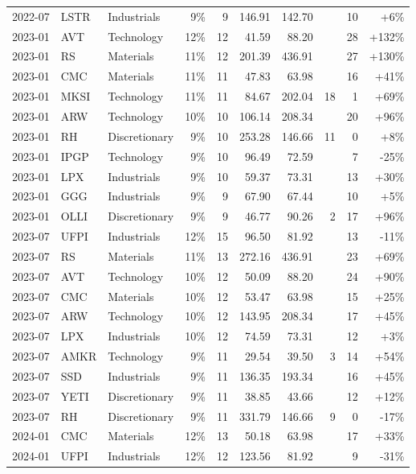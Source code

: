 \documentclass[11pt,a4paper]{article}
\begin{document}
{\begin{longtable}{l l l r r r r r r r}
2022-07 & LSTR & Industrials & 9\% & 9 & 146.91 & 142.70 &  & 10 & +6\% \\
2023-01 & AVT & Technology & 12\% & 12 & 41.59 & 88.20 &  & 28 & +132\% \\
2023-01 & RS & Materials & 11\% & 12 & 201.39 & 436.91 &  & 27 & +130\% \\
2023-01 & CMC & Materials & 11\% & 11 & 47.83 & 63.98 &  & 16 & +41\% \\
2023-01 & MKSI & Technology & 11\% & 11 & 84.67 & 202.04 & 18 & 1 & +69\% \\
2023-01 & ARW & Technology & 10\% & 10 & 106.14 & 208.34 &  & 20 & +96\% \\
2023-01 & RH & Discretionary & 9\% & 10 & 253.28 & 146.66 & 11 & 0 & +8\% \\
2023-01 & IPGP & Technology & 9\% & 10 & 96.49 & 72.59 &  & 7 & -25\% \\
2023-01 & LPX & Industrials & 9\% & 10 & 59.37 & 73.31 &  & 13 & +30\% \\
2023-01 & GGG & Industrials & 9\% & 9 & 67.90 & 67.44 &  & 10 & +5\% \\
2023-01 & OLLI & Discretionary & 9\% & 9 & 46.77 & 90.26 & 2 & 17 & +96\% \\
2023-07 & UFPI & Industrials & 12\% & 15 & 96.50 & 81.92 &  & 13 & -11\% \\
2023-07 & RS & Materials & 11\% & 13 & 272.16 & 436.91 &  & 23 & +69\% \\
2023-07 & AVT & Technology & 10\% & 12 & 50.09 & 88.20 &  & 24 & +90\% \\
2023-07 & CMC & Materials & 10\% & 12 & 53.47 & 63.98 &  & 15 & +25\% \\
2023-07 & ARW & Technology & 10\% & 12 & 143.95 & 208.34 &  & 17 & +45\% \\
2023-07 & LPX & Industrials & 10\% & 12 & 74.59 & 73.31 &  & 12 & +3\% \\
2023-07 & AMKR & Technology & 9\% & 11 & 29.54 & 39.50 & 3 & 14 & +54\% \\
2023-07 & SSD & Industrials & 9\% & 11 & 136.35 & 193.34 &  & 16 & +45\% \\
2023-07 & YETI & Discretionary & 9\% & 11 & 38.85 & 43.66 &  & 12 & +12\% \\
2023-07 & RH & Discretionary & 9\% & 11 & 331.79 & 146.66 & 9 & 0 & -17\% \\
2024-01 & CMC & Materials & 12\% & 13 & 50.18 & 63.98 &  & 17 & +33\% \\
2024-01 & UFPI & Industrials & 12\% & 12 & 123.56 & 81.92 &  & 9 & -31\% \\

\end{longtable}}
\end{document}
